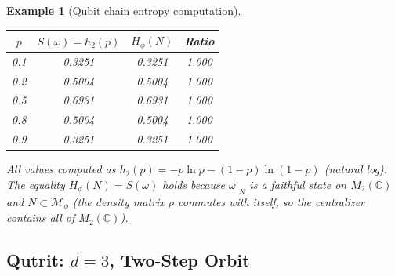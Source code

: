 \documentclass[12pt,a4paper]{article}
\newtheorem{example}[theorem]{Example}
\newcommand{\CC}{\mathbb{C}}
\newcommand{\Hphi}{H_{\phi}}
\begin{document}
\begin{example}[Qubit chain entropy computation]
\begin{center}
\begin{tabular}{@{}cccc@{}}
\toprule
$p$ & $S(\omega)=h_2(p)$ & $\Hphi(N)$ & Ratio \\
\midrule
0.1 & 0.3251 & 0.3251 & 1.000 \\
0.2 & 0.5004 & 0.5004 & 1.000 \\
0.5 & 0.6931 & 0.6931 & 1.000 \\
0.8 & 0.5004 & 0.5004 & 1.000 \\
0.9 & 0.3251 & 0.3251 & 1.000 \\
\bottomrule
\end{tabular}
\end{center}

\vspace{4pt}\noindent All values computed as $h_2(p)=-p\ln p-(1-p)\ln(1-p)$ (natural log).
The equality $\Hphi(N)=S(\omega)$ holds because $\omega|_N$ is a faithful state on
$M_2(\CC)$ and $N\subset\mathcal{M}_\phi$ (the density matrix $\rho$ commutes with itself,
so the centralizer contains all of $M_2(\CC)$).

\end{example}

\subsection{Qutrit: $d=3$, Two-Step Orbit}
\end{document}
